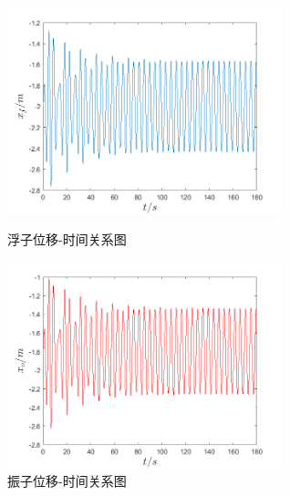 \documentclass{my_paper}
\begin{document}
\begin{figure}[!htbp]
    \centering
    \begin{minipage}[t]{0.48\textwidth}
    \centering
    \includegraphics[width=8cm]{1-2f.png}
    \caption{浮子位移-时间关系图}
    \end{minipage}
    \begin{minipage}[t]{0.48\textwidth}
    \centering
    \includegraphics[width=8cm]{1-2o.png}
    \caption{振子位移-时间关系图}
    \end{minipage}
    \end{figure}
\newpage
\end{document}
